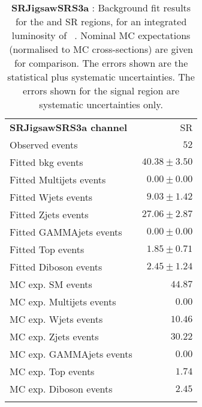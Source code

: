 

\begin{table}
\begin{center}
\setlength{\tabcolsep}{0.0pc}
{\tiny
\begin{tabular*}{\textwidth}{@{\extracolsep{\fill}}lr}
\noalign{\smallskip}\hline\noalign{\smallskip}
{\bf SRJigsawSRS3a channel}           & SR              \\[-0.05cm]
\noalign{\smallskip}\hline\noalign{\smallskip}
Observed events          & $52$                    \\
\noalign{\smallskip}\hline\noalign{\smallskip}
Fitted bkg events         & $40.38 \pm 3.50$              \\
\noalign{\smallskip}\hline\noalign{\smallskip}
        Fitted Multijets events         & $0.00 \pm 0.00$              \\
        Fitted Wjets events         & $9.03 \pm 1.42$              \\
        Fitted Zjets events         & $27.06 \pm 2.87$              \\
        Fitted GAMMAjets events         & $0.00 \pm 0.00$              \\
        Fitted Top events         & $1.85 \pm 0.71$              \\
        Fitted Diboson events         & $2.45 \pm 1.24$              \\
 \noalign{\smallskip}\hline\noalign{\smallskip}
MC exp. SM events              & $44.87$              \\
\noalign{\smallskip}\hline\noalign{\smallskip}
        MC exp. Multijets events         & $0.00$              \\
        MC exp. Wjets events         & $10.46$              \\
        MC exp. Zjets events         & $30.22$              \\
        MC exp. GAMMAjets events         & $0.00$              \\
        MC exp. Top events         & $1.74$              \\
        MC exp. Diboson events         & $2.45$              \\
\noalign{\smallskip}\hline\noalign{\smallskip}
\end{tabular*}
}
\end{center}
\caption{{\bf SRJigsawSRS3a} : Background fit results for the  and SR regions, for an integrated luminosity of \ourintlumi~\ifb. Nominal MC expectations (normalised to MC cross-sections) are given for comparison. The errors shown are the statistical plus systematic uncertainties. The errors shown for the signal region are systematic uncertainties only.}
\label{table.results.systematics.in.logL.fit.SR.SRJigsawSRS3a}
\end{table}
%